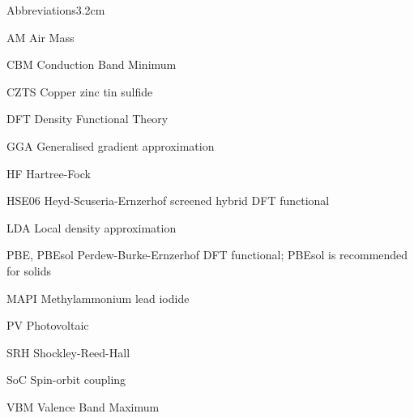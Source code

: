 \begin{mclistof}{Abbreviations}{3.2cm}

\item[AM] Air Mass
\item[CBM] Conduction Band Minimum
\item[CZTS] Copper zinc tin sulfide
\item[DFT] Density Functional Theory
\item[GGA] Generalised gradient approximation
\item[HF] Hartree-Fock
\item[HSE06] Heyd-Scuseria-Ernzerhof screened hybrid DFT functional 
\item[LDA] Local density approximation
\item[PBE, PBEsol] Perdew-Burke-Ernzerhof DFT functional; PBEsol is recommended for solids
\item[MAPI] Methylammonium lead iodide
\item[PV] Photovoltaic
\item[SRH] Shockley-Reed-Hall 
\item[SoC] Spin-orbit coupling
\item[VBM] Valence Band Maximum

\end{mclistof} 
